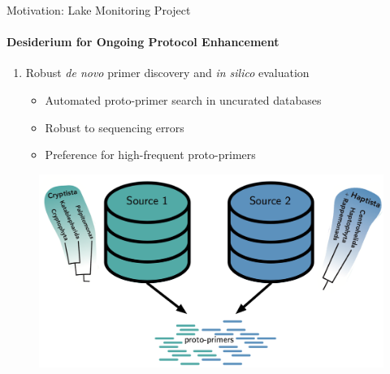 \documentclass[xcolor=dvipsnames,envcountsect]{beamer}
\begin{document}
\begin{frame}{Motivation: Lake Monitoring Project}
\framesubtitle{Desiderium for Ongoing Protocol Enhancement}
\begin{enumerate}[I]
    \item Robust {\it de novo} primer discovery and {\it in silico} evaluation %
    \begin{itemize}
        \item Automated proto-primer search in uncurated databases %
        \item Robust to sequencing errors
        \item Preference for high-frequent proto-primers %
    \end{itemize}
\end{enumerate}
\begin{figure}
    \includegraphics[scale=.4]{DB_protoprimers}
\end{figure}
\end{frame}

\end{document}
